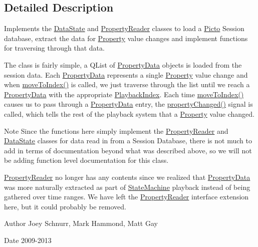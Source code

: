 \subsection{Detailed Description}
Implements the \hyperlink{class_picto_1_1_data_state}{Data\-State} and \hyperlink{class_picto_1_1_property_reader}{Property\-Reader} classes to load a \hyperlink{namespace_picto}{Picto} Session database, extract the data for \hyperlink{class_picto_1_1_property}{Property} value changes and implement functions for traversing through that data. 

The class is fairly simple, a Q\-List of \hyperlink{struct_picto_1_1_property_data}{Property\-Data} objects is loaded from the session data. Each \hyperlink{struct_picto_1_1_property_data}{Property\-Data} represents a single \hyperlink{class_picto_1_1_property}{Property} value change and when \hyperlink{class_picto_1_1_property_state_ab6fd8407780b65caf4a1177c799c8c28}{move\-To\-Index()} is called, we just traverse through the list until we reach a \hyperlink{struct_picto_1_1_property_data}{Property\-Data} with the appropriate \hyperlink{struct_picto_1_1_playback_index}{Playback\-Index}. Each time \hyperlink{class_picto_1_1_property_state_ab6fd8407780b65caf4a1177c799c8c28}{move\-To\-Index()} causes us to pass through a \hyperlink{struct_picto_1_1_property_data}{Property\-Data} entry, the \hyperlink{class_picto_1_1_property_state_a2e3494edb897629349f7cd4506c03f10}{property\-Changed()} signal is called, which tells the rest of the playback system that a \hyperlink{class_picto_1_1_property}{Property} value changed.

\begin{DoxyNote}{Note}
Since the functions here simply implement the \hyperlink{class_picto_1_1_property_reader}{Property\-Reader} and \hyperlink{class_picto_1_1_data_state}{Data\-State} classes for data read in from a Session Database, there is not much to add in terms of documentation beyond what was described above, so we will not be adding function level documentation for this class.

\hyperlink{class_picto_1_1_property_reader}{Property\-Reader} no longer has any contents since we realized that \hyperlink{struct_picto_1_1_property_data}{Property\-Data} was more naturally extracted as part of \hyperlink{class_picto_1_1_state_machine}{State\-Machine} playback instead of being gathered over time ranges. We have left the \hyperlink{class_picto_1_1_property_reader}{Property\-Reader} interface extension here, but it could probably be removed. 
\end{DoxyNote}
\begin{DoxyAuthor}{Author}
Joey Schnurr, Mark Hammond, Matt Gay 
\end{DoxyAuthor}
\begin{DoxyDate}{Date}
2009-\/2013 
\end{DoxyDate}



